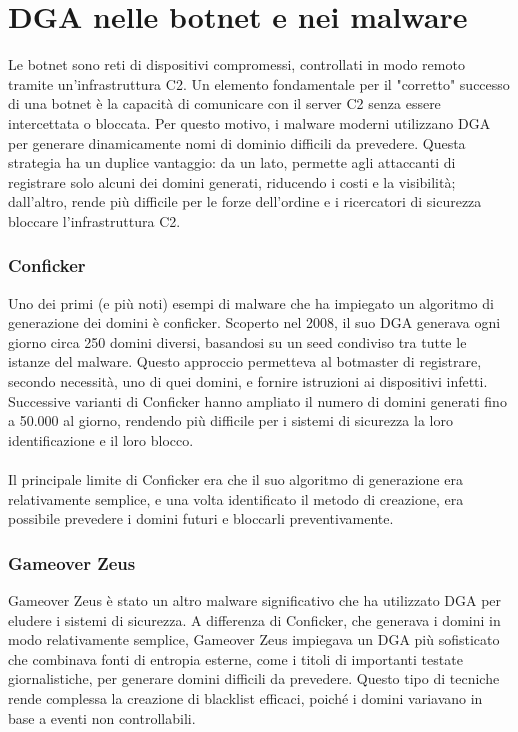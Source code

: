 \section*{DGA nelle botnet e nei malware}
Le botnet sono reti di dispositivi compromessi, controllati in modo 
remoto tramite un'infrastruttura C2. Un elemento fondamentale per il "corretto"
successo di una botnet è la capacità di comunicare con il server C2 
senza essere intercettata o bloccata. 
Per questo motivo, i malware moderni utilizzano DGA per generare 
dinamicamente nomi di dominio difficili da prevedere. 
Questa strategia ha un duplice vantaggio: da un lato, permette agli 
attaccanti di registrare solo alcuni dei domini generati, riducendo 
i costi e la visibilità; dall'altro, rende più difficile per le forze
dell'ordine e i ricercatori di sicurezza bloccare l'infrastruttura C2.

\subsubsection*{Conficker}
Uno dei primi (e più noti) esempi di malware che ha impiegato un 
algoritmo di generazione dei domini è conficker. Scoperto 
nel 2008, il suo DGA generava ogni giorno circa 250 domini diversi,
basandosi su un seed condiviso tra tutte le istanze del malware. 
Questo approccio permetteva al botmaster di registrare, secondo necessità,
uno di quei domini, e fornire istruzioni ai dispositivi infetti. Successive 
varianti di Conficker hanno ampliato il numero di domini generati 
fino a 50.000 al giorno, rendendo più difficile per i sistemi di sicurezza 
la loro identificazione e il loro blocco. 
\\\\
Il principale limite di Conficker era che il suo algoritmo di
generazione era relativamente semplice, e una volta identificato 
il metodo di creazione, era possibile prevedere i domini futuri e 
bloccarli preventivamente.

\subsubsection*{Gameover Zeus}
Gameover Zeus è stato un altro malware significativo che ha 
utilizzato DGA per eludere i sistemi di sicurezza. A differenza di 
Conficker, che generava i domini in modo relativamente semplice, 
Gameover Zeus impiegava un DGA più sofisticato che combinava fonti 
di entropia esterne, come i titoli di importanti testate giornalistiche, per 
generare domini difficili da prevedere. Questo tipo di tecniche rende complessa la 
creazione di blacklist efficaci, poiché i domini variavano in base a 
eventi non controllabili.

